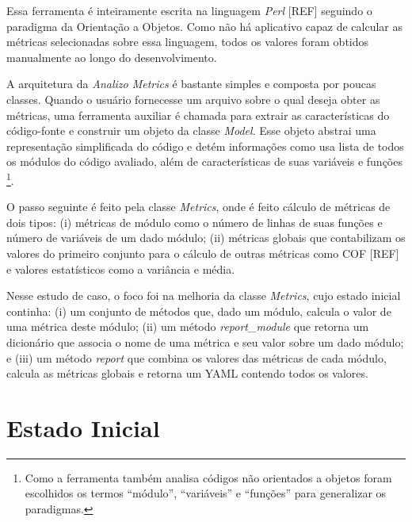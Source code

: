 Essa ferramenta é inteiramente escrita na linguagem \textit{Perl} [REF] seguindo o paradigma da
Orientação a Objetos. Como não há aplicativo capaz de calcular as métricas selecionadas
sobre essa linguagem, todos os valores foram obtidos manualmente ao longo do desenvolvimento.

A arquitetura da \textit{Analizo Metrics} é bastante simples e composta por poucas classes.
Quando o usuário fornecesse um arquivo sobre o qual deseja obter as métricas, uma ferramenta
auxiliar é chamada para extrair as características do código-fonte e construir um objeto da
classe \textit{Model}. Esse objeto abstrai uma representação simplificada do código e detém 
informações como usa lista de todos os módulos do código avaliado, além de características
de suas variáveis e funções \footnote{Como a ferramenta também analisa códigos não orientados
a objetos foram escolhidos os termos ``módulo'', ``variáveis'' e ``funções'' para generalizar os paradigmas.}.

O passo seguinte é feito pela classe \textit{Metrics}, onde é feito cálculo de métricas de dois 
tipos: (i) métricas de módulo como o número de linhas de suas funções e número de variáveis de
um dado módulo; (ii) métricas globais que contabilizam os valores do primeiro conjunto para o
cálculo de outras métricas como COF [REF] e valores estatísticos como a variância e média.

Nesse estudo de caso, o foco foi na melhoria da classe \textit{Metrics}, cujo estado inicial continha:
(i) um conjunto de métodos que, dado um módulo, calcula o valor de uma métrica deste módulo;
(ii) um método \textit{report\_module} que retorna um dicionário que associa o nome de uma métrica
e seu valor sobre um dado módulo; e (iii) um método \textit{report} que combina os valores das métricas
de cada módulo, calcula as métricas globais e retorna um YAML contendo todos os valores.

\section{Estado Inicial}
